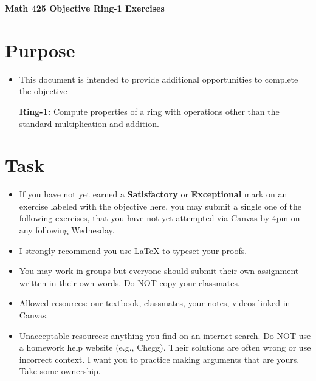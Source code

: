 \documentclass[12pt]{article}
\begin{document}
	\begin{center}
		{\Large \bf Math 425 Objective Ring-1 Exercises}
	\end{center}
	\section*{Purpose}
	\begin{itemize}
		\item This document is intended to provide additional opportunities to complete the objective
		
		\textbf{Ring-1:} Compute properties of a ring with operations other than the standard multiplication and addition.
	\end{itemize}
	\section*{Task}
	\begin{itemize}
		\item If you have not yet earned a \textbf{Satisfactory} or \textbf{Exceptional} mark on an exercise labeled with the objective here, you may submit a single one of the following exercises, that you have not yet attempted via Canvas by 4pm on any following Wednesday.
		\item I strongly recommend you use LaTeX to typeset your proofs.
		\item You may work in groups but everyone should submit their own assignment written in their own words.  Do NOT copy your classmates.
		\item Allowed resources: our textbook, classmates, your notes, videos linked in Canvas.
		\item Unacceptable resources: anything you find on an internet search. Do NOT use a homework help website (e.g., Chegg). Their solutions are often wrong or use incorrect context.  I want you to practice making arguments that are yours. Take some ownership.
	\end{itemize}
\end{document}
